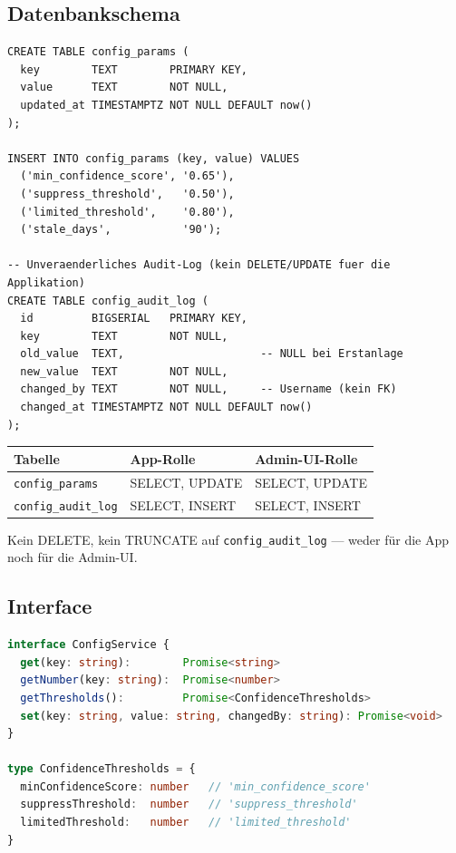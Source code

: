 \documentclass[a4paper, 11pt, oneside]{report}
\newcommand{\code}[1]{\texttt{\small #1}}
\begin{document}
\subsection{Datenbankschema}

\begin{lstlisting}[language=LearnSQL]
CREATE TABLE config_params (
  key        TEXT        PRIMARY KEY,
  value      TEXT        NOT NULL,
  updated_at TIMESTAMPTZ NOT NULL DEFAULT now()
);

INSERT INTO config_params (key, value) VALUES
  ('min_confidence_score', '0.65'),
  ('suppress_threshold',   '0.50'),
  ('limited_threshold',    '0.80'),
  ('stale_days',           '90');

-- Unveraenderliches Audit-Log (kein DELETE/UPDATE fuer die Applikation)
CREATE TABLE config_audit_log (
  id         BIGSERIAL   PRIMARY KEY,
  key        TEXT        NOT NULL,
  old_value  TEXT,                     -- NULL bei Erstanlage
  new_value  TEXT        NOT NULL,
  changed_by TEXT        NOT NULL,     -- Username (kein FK)
  changed_at TIMESTAMPTZ NOT NULL DEFAULT now()
);
\end{lstlisting}

\begin{table}[htb]
\small\centering
\begin{tabular}{@{}lll@{}}
\toprule
\rowcolor{tabhead}
\textbf{Tabelle} & \textbf{App-Rolle} & \textbf{Admin-UI-Rolle} \\
\midrule
\code{config\_params}    & SELECT, UPDATE         & SELECT, UPDATE \\
\code{config\_audit\_log} & SELECT, INSERT         & SELECT, INSERT \\
\bottomrule
\end{tabular}
\end{table}

Kein DELETE, kein TRUNCATE auf \code{config\_audit\_log} ---
weder für die App noch für die Admin-UI.

\subsection{Interface}

\begin{lstlisting}[language=TypeScript]
interface ConfigService {
  get(key: string):        Promise<string>
  getNumber(key: string):  Promise<number>
  getThresholds():         Promise<ConfidenceThresholds>
  set(key: string, value: string, changedBy: string): Promise<void>
}

type ConfidenceThresholds = {
  minConfidenceScore: number   // 'min_confidence_score'
  suppressThreshold:  number   // 'suppress_threshold'
  limitedThreshold:   number   // 'limited_threshold'
}
\end{lstlisting}
\end{document}
